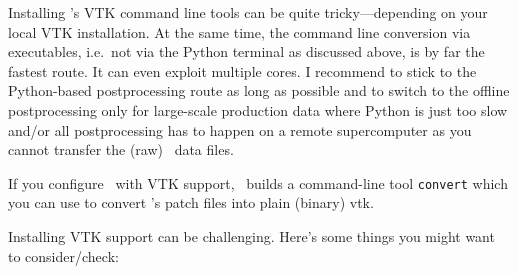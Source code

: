 Installing \Peano's VTK command line tools can be quite tricky---depending on your
local VTK installation.
At the same time, the command line conversion via executables, i.e.~not via the 
Python terminal as discussed above, is by far the fastest route.
It  can even exploit multiple cores.
I recommend to stick to the Python-based postprocessing route as long as possible 
and to switch to the offline postprocessing only for large-scale production data
where Python is just too slow and/or all postprocessing has to happen on a remote 
supercomputer as you cannot transfer the (raw) \Peano\ data files.


\begin{remark}
  If you configure \Peano\ with VTK support, \Peano\ builds a command-line tool
  \texttt{convert} which you can use to convert \Peano 's patch files into plain
  (binary) vtk.
\end{remark}



\noindent
Installing VTK support can be challenging. 
Here's some things you might want to consider/check:

